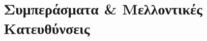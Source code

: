 \documentclass[diploma]{softlab-thesis}
\begin{document}
\chapter{Συμπεράσματα \& Μελλοντικές Κατευθύνσεις}
\label{chap:chapter6}


\nocite{*}

%













\end{document}
